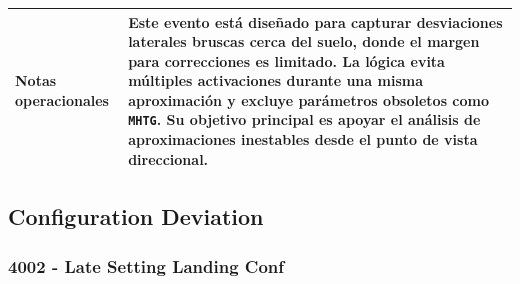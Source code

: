 \documentclass[11pt,a4paper]{article}
\begin{document}
\begin{longtable}{p{5cm} p{9.5cm}}
		\textbf{Notas operacionales} &
		Este evento está diseñado para capturar desviaciones laterales bruscas cerca del suelo, donde el margen para correcciones es limitado.  
		La lógica evita múltiples activaciones durante una misma aproximación y excluye parámetros obsoletos como \texttt{MHTG}.  
		Su objetivo principal es apoyar el análisis de aproximaciones inestables desde el punto de vista direccional. \\
		\hline
		
	\end{longtable}
	
	\subsection{Configuration Deviation}
	
	\subsubsection{4002 - Late Setting Landing Conf}
	
\end{document}
